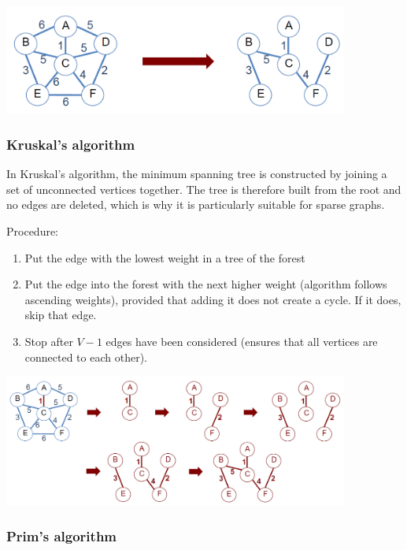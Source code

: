 \begin{center}\includegraphics[width=0.85\textwidth]{img/graphs/MinimumSpanningTree.png}\end{center}

\subsubsection{Kruskal's algorithm}

In Kruskal's algorithm, the minimum spanning tree is constructed by joining a set of unconnected vertices together. The tree is therefore built from the root and no edges are deleted, which is why it is particularly suitable for sparse graphs.

Procedure:
\begin{enumerate}
    \item Put the edge with the lowest weight in a tree of the forest
    \item Put the edge into the forest with the next higher weight (algorithm follows ascending weights), provided that adding it does not create a cycle. If it does, skip that edge.
    \item Stop after $V-1$ edges have been considered (ensures that all vertices are connected to each other). 
\end{enumerate}

\begin{center}\includegraphics[width=0.85\textwidth]{img/graphs/KruskalGraph.png}\end{center}

%

\subsubsection{Prim's algorithm}

